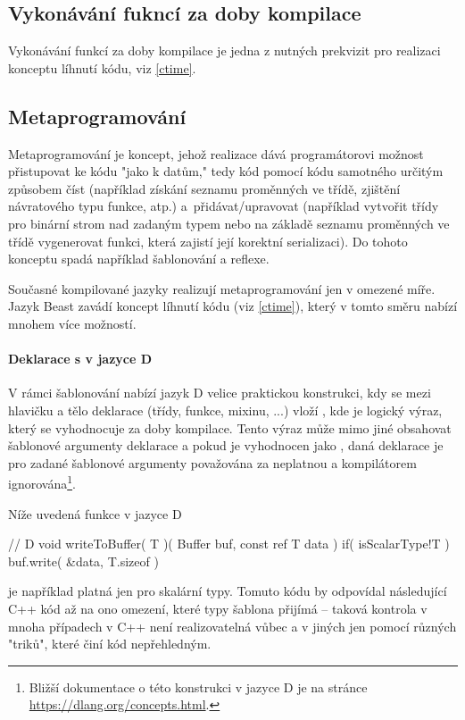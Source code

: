 \subsection{Vykonávání fukncí za doby kompilace}
Vykonávání funkcí za doby kompilace je jedna z nutných prekvizit pro realizaci konceptu líhnutí kódu, viz \autoref{ctime}.

\subsection{Metaprogramování} \label{metaprogramming}
Metaprogramování je koncept, jehož realizace dává programátorovi možnost přistupovat ke kódu "jako k datům," tedy kód pomocí kódu samotného určitým způsobem číst (například získání seznamu proměnných ve třídě, zjištění návratového typu funkce, atp.) a~přidávat/upravovat (například vytvořit třídy pro binární strom nad zadaným typem nebo na základě seznamu proměnných ve třídě vygenerovat funkci, která zajistí její korektní serializaci). Do tohoto konceptu spadá například šablonování a reflexe.

Současné kompilované jazyky realizují metaprogramování jen v omezené míře. Jazyk Beast zavádí koncept líhnutí kódu (viz \autoref{ctime}), který v tomto směru nabízí mnohem více možností.

\paragraph{Deklarace s  v jazyce D}
V rámci šablonování nabízí jazyk D velice praktickou konstrukci, kdy se mezi hlavičku a tělo deklarace (třídy, funkce, mixinu, ...) vloží , kde  je logický výraz, který se vyhodnocuje za doby kompilace. Tento výraz může mimo jiné obsahovat šablonové argumenty deklarace a pokud je vyhodnocen jako , daná deklarace je pro zadané šablonové argumenty považována za neplatnou a kompilátorem ignorována\footnote{Bližší dokumentace o této konstrukci v jazyce D je na stránce \url{https://dlang.org/concepts.html}.}.

Níže uvedená funkce v jazyce D
\begin{dcode}
// D
void writeToBuffer( T )( Buffer buf, const ref T data )
	if( isScalarType!T )
{
	buf.write( &data, T.sizeof )
}
\end{dcode}
je například platná jen pro skalární typy. Tomuto kódu by odpovídal následující C++ kód až na ono omezení, které typy šablona přijímá -- taková kontrola v mnoha případech v C++ není realizovatelná vůbec a v jiných jen pomocí různých "triků", které činí kód nepřehledným.

